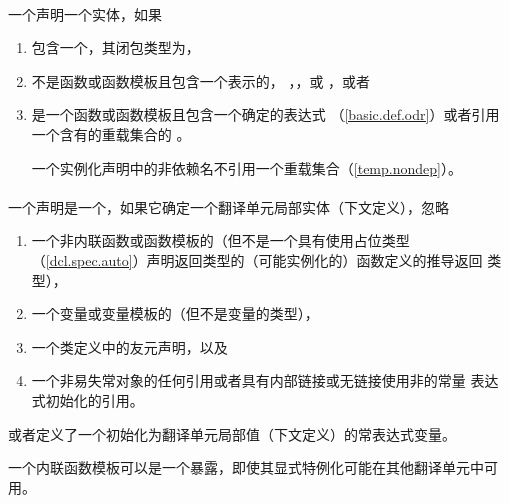 \paragraph{} %
一个声明一个实体，如果
\begin{enumerate}
  \item {}包含一个，其闭包类型为，
  \item {}不是函数或函数模板且包含一个表示的，
        ，，或
        ，或者
  \item {}是一个函数或函数模板且包含一个确定的表达式
        （\ref{basic.def.odr}）或者引用一个含有的重载集合的
        。

        \begin{note}
          一个实例化声明中的非依赖名不引用一个重载集合（\ref{temp.nondep}）。
        \end{note}
\end{enumerate}

\paragraph{} %
一个声明是一个，如果它确定一个翻译单元局部实体（下文定义），忽略
\begin{enumerate}
  \item 一个非内联函数或函数模板的（但不是一个具有使用占位类型
        （\ref{dcl.spec.auto}）声明返回类型的（可能实例化的）函数定义的推导返回
        类型），
  \item 一个变量或变量模板的（但不是变量的类型），
  \item 一个类定义中的友元声明，以及
  \item 一个非易失常对象的任何引用或者具有内部链接或无链接使用非\odruse{}的常量
        表达式初始化的引用。
\end{enumerate}
或者定义了一个初始化为翻译单元局部值（下文定义）的常表达式变量。

\begin{note}
  一个内联函数模板可以是一个暴露，即使其显式特例化可能在其他翻译单元中可用。
\end{note}

